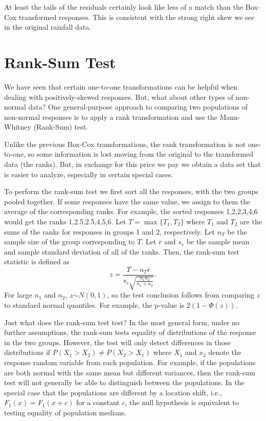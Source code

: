 \documentclass[
]{book}
\begin{document}
At least the tails of the residuals certainly look like less of a match than the Box-Cox transformed responses. This is consistent with the strong right skew we see in the original rainfall data.

\hypertarget{rank-sum-test}{%
\section{Rank-Sum Test}\label{rank-sum-test}}

We have seen that certain one-to-one transformations can be helpful when dealing with positively-skewed responses. But, what about other types of non-normal data? One general-purpose approach to comparing two populations of non-normal responses is to apply a rank transformation and use the Mann-Whitney (Rank-Sum) test.

Unlike the previous Box-Cox transformations, the rank transformation is not one-to-one, so some information is lost moving from the original to the transformed data (the ranks). But, in exchange for this price we pay we obtain a data set that is easier to analyze, especially in certain special cases.

To perform the rank-sum test we first sort all the responses, with the two groups pooled together. If some responses have the same value, we assign to them the average of the corresponding ranks. For example, the sorted responses 1,2,2,3,4,6 would get the ranks 1,2.5,2.5,4,5,6. Let \(T = \max\{T_1, T_2\}\) where \(T_1\) and \(T_2\) are the sums of the ranks for responses in groups 1 and 2, respectively. Let \(n_T\) be the sample size of the group corresponding to \(T\). Let \(\overline r\) and \(s_r\) be the sample mean and sample standard deviation of all of the ranks. Then, the rank-sum test statistic is defined as
\[z = \frac{T - n_T\overline r}{s_r\sqrt{\frac{n_1n_2}{n_1+n_2}}}.\]
For large \(n_1\) and \(n_2\), \(z \stackrel{\cdot}{\sim}N(0,1)\), so the test conclusion follows from comparing \(z\) to standard normal quantiles. For example, the p-value is \(2(1-\Phi(z))\).

Just what does the rank-sum test test? In the most general form, under no further assumptions, the rank-sum tests equality of distributions of the response in the two groups. However, the test will only detect differences in those distributions if \(P(X_1 > X_2) \ne P(X_2 > X_1)\) where \(X_1\) and \(x_2\) denote the response random variable from each population. For example, if the populations are both normal with the same mean but different variances, then the rank-sum test will not generally be able to distinguish between the populations. In the special case that the populations are different by a location shift, i.e., \(F_1(x) = F_1(x+c)\) for a constant \(c\), the null hypothesis is equivalent to testing equality of population medians.
\end{document}
